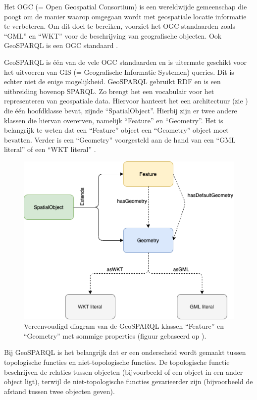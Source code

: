 \documentclass[twocolumn]{phdsymp} %
\begin{document}
Het OGC (= Open Geospatial Consortium) is een wereldwijde gemeenschap die poogt om de manier waarop omgegaan wordt met geospatiale locatie informatie te verbeteren. Om dit doel te bereiken, voorziet het OGC standaarden zoals ``GML'' en ``WKT'' voor de beschrijving van geografische objecten. Ook GeoSPARQL is een OGC standaard \cite{ogcdocs}.

GeoSPARQL is één van de vele OGC standaarden en is uitermate geschikt voor het uitvoeren van GIS (= Geografische Informatie Systemen) queries. Dit is echter niet de enige mogelijkheid. GeoSPARQL gebruikt RDF en is een uitbreiding bovenop SPARQL. Zo brengt het een vocabulair voor het representeren van geospatiale data. Hiervoor hanteert het een architectuur (zie ) die één hoofdklasse bevat, zijnde ``SpatialObject''. Hierbij zijn er twee andere klassen die hiervan overerven, namelijk ``Feature'' en ``Geometry''. Het is belangrijk te weten dat een ``Feature'' object een ``Geometry'' object moet bevatten. Verder is een ``Geometry'' voorgesteld aan de hand van een ``GML literal'' of een ``WKT literal'' \cite{ogcdocs}.

\begin{figure}[ht]
    \centering
    \includegraphics[width=\linewidth]{images/geosparql_architecture.png}
    \caption{Vereenvoudigd diagram van de GeoSPARQL klassen ``Feature'' en ``Geometry'' met sommige properties (figuur gebaseerd op \protect\cite{geosparqlsupport}).}
    \label{fig:abstr_geosparql_architecture}
\end{figure}

Bij GeoSPARQL is het belangrijk dat er een onderscheid wordt gemaakt tussen topologische functies en niet-topologische functies. De topologische functie beschrijven de relaties tussen objecten (bijvoorbeeld of een object in een ander object ligt), terwijl de niet-topologische functies gevarieerder zijn (bijvoorbeeld de afstand tussen twee objecten geven). 
\end{document}
